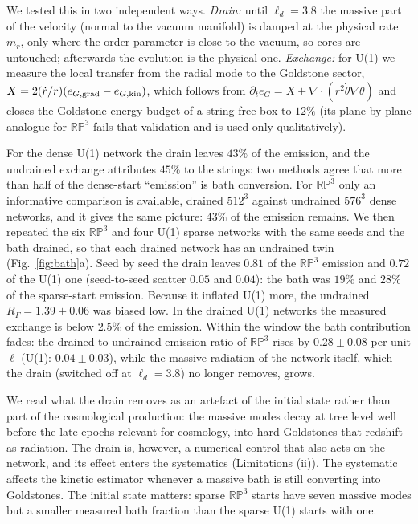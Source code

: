 \documentclass[prd,twocolumn,superscriptaddress,nofootinbib,amsmath,amssymb]{revtex4-2}
\newcommand{\RP}{\mathbb{RP}^3}
\newcommand{\RG}{R_\Gamma}
\begin{document}
We tested this in two independent ways.
\emph{Drain:} until $\ell_d=3.8$ the massive part of the velocity (normal to the vacuum manifold) is damped at the physical rate $m_r$, only where the order parameter is close to the vacuum, so cores are untouched; afterwards the evolution is the physical one.
\emph{Exchange:} for U(1) we measure the local transfer from the radial mode to the Goldstone sector, $X=2(\dot r/r)(e_{G,\rm grad}-e_{G,\rm kin})$, which follows from $\partial_te_G=X+\nabla\cdot(r^2\dot\theta\nabla\theta)$ and closes the Goldstone energy budget of a string-free box to $12\%$ (its plane-by-plane analogue for $\RP$ fails that validation and is used only qualitatively).

For the dense U(1) network the drain leaves $43\%$ of the emission, and the undrained exchange attributes $45\%$ to the strings: two methods agree that more than half of the dense-start ``emission'' is bath conversion.
For $\RP$ only an informative comparison is available, drained $512^3$ against undrained $576^3$ dense networks, and it gives the same picture: $43\%$ of the emission remains.
We then repeated the six $\RP$ and four U(1) sparse networks with the same seeds and the bath drained, so that each drained network has an undrained twin (Fig.~\ref{fig:bath}a).
Seed by seed the drain leaves $0.81$ of the $\RP$ emission and $0.72$ of the U(1) one (seed-to-seed scatter $0.05$ and $0.04$): the bath was $19\%$ and $28\%$ of the sparse-start emission.
Because it inflated U(1) more, the undrained $\RG=1.39\pm0.06$ was biased low.
In the drained U(1) networks the measured exchange is below $2.5\%$ of the emission.
Within the window the bath contribution fades: the drained-to-undrained emission ratio of $\RP$ rises by $0.28\pm0.08$ per unit $\ell$ (U(1): $0.04\pm0.03$), while the massive radiation of the network itself, which the drain (switched off at $\ell_d=3.8$) no longer removes, grows.

We read what the drain removes as an artefact of the initial state rather than part of the cosmological production: the massive modes decay at tree level well before the late epochs relevant for cosmology, into hard Goldstones that redshift as radiation. The drain is, however, a numerical control that also acts on the network, and its effect enters the systematics (Limitations (ii)).
The systematic affects the kinetic estimator whenever a massive bath is still converting into Goldstones. The initial state matters: sparse $\RP$ starts have seven massive modes but a smaller measured bath fraction than the sparse U(1) starts with one.
\end{document}
